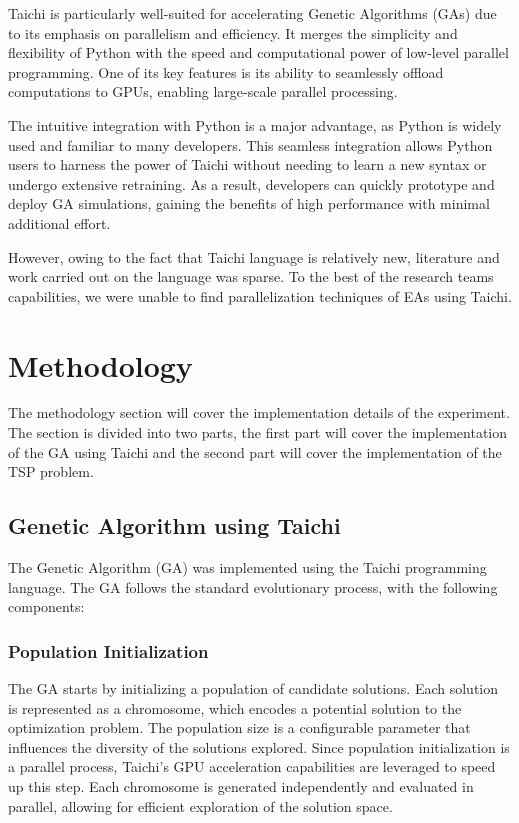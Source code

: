 \documentclass[conference]{IEEEtran}
\begin{document}
Taichi is particularly well-suited for accelerating Genetic Algorithms (GAs)
due to its emphasis on parallelism and efficiency. It merges the simplicity and
flexibility of Python with the speed and computational power of low-level
parallel programming. One of its key features is its ability to seamlessly
offload computations to GPUs, enabling large-scale parallel processing.

The intuitive integration with Python is a major advantage, as Python is widely
used and familiar to many developers. This seamless integration allows Python
users to harness the power of Taichi without needing to learn a new syntax or
undergo extensive retraining. As a result, developers can quickly prototype and
deploy GA simulations, gaining the benefits of high performance with minimal
additional effort.

However, owing to the fact that Taichi language is relatively new, literature
and work carried out on the language was sparse. To the best of the research
teams capabilities, we were unable to find parallelization techniques of EAs
using Taichi.

\section{Methodology}
The methodology section will cover the implementation details of the
experiment. The section is divided into two parts, the first part will cover
the implementation of the GA using Taichi and the second part will cover the
implementation of the TSP problem.

\subsection{Genetic Algorithm using Taichi}
The Genetic Algorithm (GA) was implemented using the Taichi programming
language. The GA follows the standard evolutionary process, with the following
components:

\subsubsection{Population Initialization}
The GA starts by initializing a population of candidate solutions. Each
solution is represented as a chromosome, which encodes a potential solution to
the optimization problem. The population size is a configurable parameter that
influences the diversity of the solutions explored. Since population
initialization is a parallel process, Taichi's GPU acceleration capabilities
are leveraged to speed up this step. Each chromosome is generated independently
and evaluated in parallel, allowing for efficient exploration of the solution
space.
\end{document}
